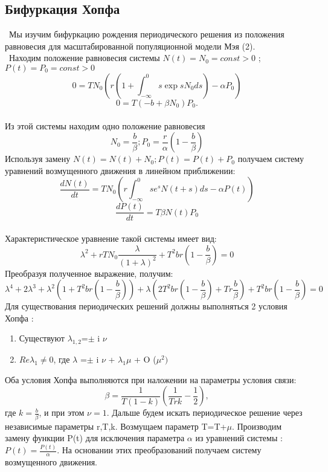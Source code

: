\documentclass[12pt]{article}
\begin{document}
\subsection{Бифуркация Хопфа}
\ Мы изучим бифуркацию рождения периодического решения из положения равновесия для масштабированной популяционной модели Мэя (2).\\
\ Находим положение равновесия системы $N(t)=N_0=const >0$ ; $P(t)=P_0=const>0$
\begin{equation*}
    0=T N_0 \left(r \left(1+ \int_{-\infty}^{0}s\exp{s} N_0 d s \right)-\alpha P_0 \right)
\end{equation*}
\begin{equation*}
    0=T\left( -b + \beta N_0\right) P_0.
\end{equation*}\\
Из этой системы находим одно положение равновесия 
\begin{equation}
    N_0= \frac{b}{\beta}; P_0=\frac{r}{\alpha}(1-\frac{b}{\beta})
\end{equation}
 Используя замену $N(t)=N(t)+N_0 ; P(t)=P(t)+P_0$ получаем  систему уравнений возмущенного движения  в линейном приближении:
 \begin{equation}
    \frac{d N(t)}{d t}=T N_0 \left(r  \int_{-\infty}^{0}s e^{s} N(t+s) d s -\alpha P(t) \right)
 \end{equation}
 \begin{equation*}
      \frac{d P(t)}{d t}=T \beta N(t) P_0
 \end{equation*}\\
 Характеристическое уравнение такой системы имеет вид:
 \begin{equation*}
     \lambda^2 + r T N_0 \frac{\lambda}{(1+\lambda)^2}+T^2 b r (1-\frac{b}{\beta})=0
 \end{equation*}
 Преобразуя полученное выражение, получим:
 \begin{equation}
     \lambda^4 +2 \lambda^3+\lambda^2(1+T^2 b r (1-\frac{b}{\beta}))+\lambda(2 T^2 b r (1-\frac{b}{\beta})+T r \frac{b}{\beta}) + T^2 b r (1-\frac{b}{\beta})=0
 \end{equation}
 Для существования периодических решений должны выполняться 2 условия Хопфа \cite{has}:
 \begin{enumerate}
 \item   Существуют $\lambda_{1,2}$=$\pm$ i $\nu$\\
 \item $ Re\lambda_1 \neq 0$, где $\lambda$ =$\pm$ i $\nu$ + $\lambda_1 \mu$ + O ($\mu^2)$\\
 \end{enumerate}
 Оба условия Хопфа выполняются при наложении на параметры условия связи:
 \begin{equation*}
     \beta=\frac{1}{T(1-k)} \left(\frac{1}{T r k} - \frac{1}{2}\right),
\end{equation*}
 где $k=\frac{b}{\beta}$, и при этом $\nu=1$. 
 Дальше будем искать периодическое решение через независимые параметры r,T,k. Возмущаем параметр T=T+$\mu$.
Производим замену функции P(t) для исключения параметра $\alpha$ из уравнений системы : $ P(t)=\frac{P(t)}{\alpha}$. На основании этих преобразований получаем систему возмущенного движения.
\newpage
\end{document}
